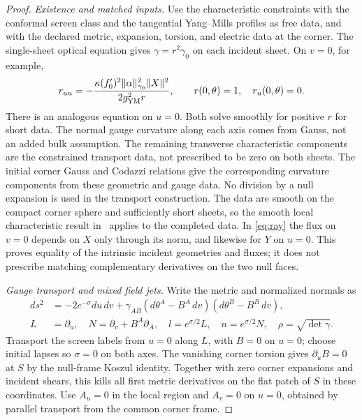 \documentclass[11pt]{article}
\begin{document}
\begin{proof}
\emph{Existence and matched inputs.}
Use the characteristic constraints with the conformal screen class and the tangential Yang--Mills profiles as free data, and with the declared metric, expansion, torsion, and electric data at the corner. The single-sheet optical equation gives \(\gamma=r^2\gamma_0\) on each incident sheet. On \(v=0\), for example,
\begin{equation}
 r_{uu}=-\frac{\kappa(f_0')^2\|\alpha\|_{\gamma_0}^2\|X\|^2}
                    {2g_{\rm YM}^2 r},\qquad r(0,\theta)=1,\quad r_u(0,\theta)=0 .
 \label{eq:ray}
\end{equation}
There is an analogous equation on \(u=0\). Both solve smoothly for positive \(r\) for short data. The normal gauge curvature along each axis comes from Gauss, not an added bulk assumption. The remaining transverse characteristic components are the constrained transport data, not prescribed to be zero on both sheets. The initial corner Gauss and Codazzi relations give the corresponding curvature components from these geometric and gauge data. No division by a null expansion is used in the transport construction. The data are smooth on the compact corner sphere and sufficiently short sheets, so the smooth local characteristic result in~\cite[Sec.~4, particularly Theorems 4.1--4.3]{MY} applies to the completed data. In \eqref{eq:ray} the flux on \(v=0\) depends on \(X\) only through its norm, and likewise for \(Y\) on \(u=0\). This proves equality of the intrinsic incident geometries and fluxes; it does not prescribe matching complementary derivatives on the two null faces.

\emph{Gauge transport and mixed field jets.}
Write the metric and normalized normals as
\begin{align*}
 ds^2&=-2e^{-\sigma}du\,dv+
  \gamma_{AB}(d\theta^A-B^A\,dv)(d\theta^B-B^B\,dv),\\
 L&=\partial_u,\quad N=\partial_v+B^A\partial_A,\quad
 l=e^{\sigma/2}L,\quad n=e^{\sigma/2}N,\quad
 \rho=\sqrt{\det\gamma}.
\end{align*}
Transport the screen labels from \(u=0\) along \(L\), with \(B=0\) on \(u=0\); choose initial lapses so \(\sigma=0\) on both axes. The vanishing corner torsion gives \(\partial_uB=0\) at \(S\) by the null-frame Koszul identity. Together with zero corner expansions and incident shears, this kills all first metric derivatives on the flat patch of \(S\) in these coordinates. Use \(A_u=0\) in the local region and \(A_v=0\) on \(u=0\), obtained by parallel transport from the common corner frame.


\end{proof}
\end{document}
